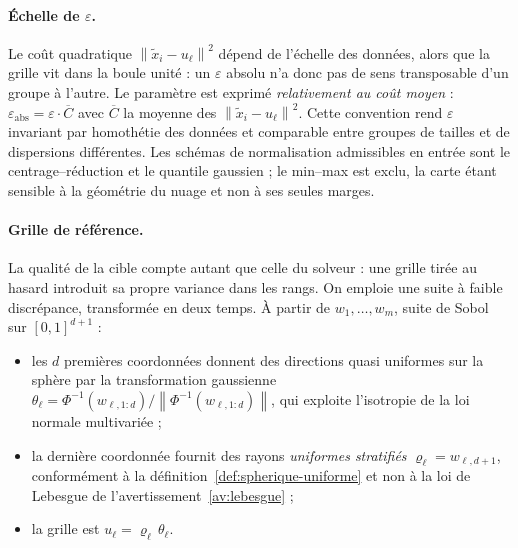 \documentclass[11pt,a4paper]{article}
\theoremstyle{definition}
\theoremstyle{remark}
\newcommand{\norm}[1]{\left\lVert #1 \right\rVert}
\begin{document}
\bigskip

\paragraph{Échelle de $\varepsilon$.} Le coût quadratique $\norm{\tilde{x}_i - u_\ell}^2$
dépend de l'échelle des données, alors que la grille vit dans la boule unité : un
$\varepsilon$ absolu n'a donc pas de sens transposable d'un groupe à l'autre. Le paramètre
est exprimé \emph{relativement au coût moyen} : $\varepsilon_{\mathrm{abs}} = \varepsilon
\cdot \overline{C}$ avec $\overline{C}$ la moyenne des $\norm{\tilde{x}_i - u_\ell}^2$.
Cette convention rend $\varepsilon$ invariant par homothétie des données et comparable
entre groupes de tailles et de dispersions différentes. Les schémas de normalisation
admissibles en entrée sont le centrage--réduction et le quantile gaussien ; le min--max est
exclu, la carte étant sensible à la géométrie du nuage et non à ses seules marges.

\medskip

\paragraph{Grille de référence.} La qualité de la cible compte autant que celle du
solveur : une grille tirée au hasard introduit sa propre variance dans les rangs. On
emploie une suite à faible discrépance, transformée en deux temps. À partir de
$w_1,\dots,w_m$, suite de Sobol sur $[0,1]^{d+1}$ :

\medskip

\begin{itemize}[nosep,leftmargin=1.4em]
  \item les $d$ premières coordonnées donnent des directions quasi uniformes sur la sphère
  par la transformation gaussienne
  $\theta_\ell = \Phi^{-1}(w_{\ell,1:d}) / \norm{\Phi^{-1}(w_{\ell,1:d})}$, qui exploite
  l'isotropie de la loi normale multivariée ;
  \item la dernière coordonnée fournit des rayons \emph{uniformes stratifiés}
  $\varrho_\ell = w_{\ell,d+1}$, conformément à la définition~\ref{def:spherique-uniforme}
  et non à la loi de Lebesgue de l'avertissement~\ref{av:lebesgue} ;
  \item la grille est $u_\ell = \varrho_\ell\,\theta_\ell$.
\end{itemize}

\bigskip
\end{document}
